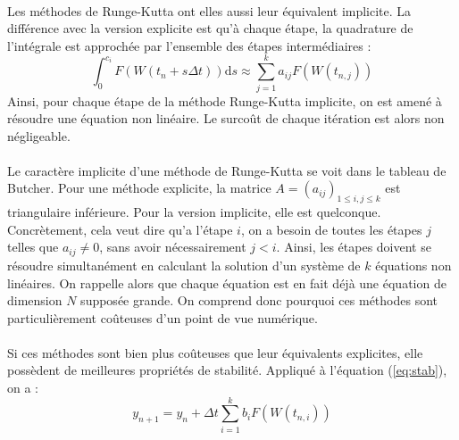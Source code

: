     \paragraph{}
    Les méthodes de Runge-Kutta ont elles aussi leur équivalent implicite.
    La différence avec la version explicite est qu'à chaque étape, la quadrature de l'intégrale est approchée par l'ensemble des étapes intermédiaires :
    \[\int_0^{c_i}F\left(W\left(t_n + s\Delta t\right)\right)\mathrm{d}s \approx \sum_{j = 1}^ka_{ij}F\left(W\left(t_{n,j}\right)\right)\]
    Ainsi, pour chaque étape de la méthode Runge-Kutta implicite, on est amené à résoudre une équation non linéaire.
    Le surcoût de chaque itération est alors non négligeable.

    \paragraph{}
    Le caractère implicite d'une méthode de Runge-Kutta se voit dans le tableau de Butcher.
    Pour une méthode explicite, la matrice $A = \left(a_{ij}\right)_{1\leq i, j\leq k}$ est triangulaire inférieure.
    Pour la version implicite, elle est quelconque.
    Concrètement, cela veut dire qu'a l'étape $i$, on a besoin de toutes les étapes $j$ telles que $a_{ij}\neq 0$, sans avoir nécessairement $j < i$.
    Ainsi, les étapes doivent se résoudre simultanément en calculant la solution d'un système de $k$ équations non linéaires.
    On rappelle alors que chaque équation est en fait déjà une équation de dimension $N$ supposée grande.
    On comprend donc pourquoi ces méthodes sont particulièrement coûteuses d'un point de vue numérique.

    \paragraph{}
    Si ces méthodes sont bien plus coûteuses que leur équivalents explicites, elle possèdent de meilleures propriétés de stabilité.
    Appliqué à l'équation (\ref{eq:stab}), on a :
    \[y_{n+1} = y_n + \Delta t \sum_{i = 1}^kb_iF\left(W\left(t_{n,i}\right)\right)\]
